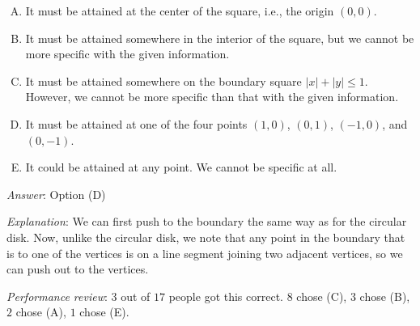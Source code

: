 \documentclass[10pt]{amsart}
\begin{document}
\begin{enumerate}
  \begin{enumerate}[(A)]
  \item It must be attained at the center of the square, i.e., the
    origin $(0,0)$.
  \item It must be attained somewhere in the interior of the square, but
    we cannot be more specific with the given information.
  \item It must be attained somewhere on the boundary square $|x| +
    |y| \le 1$. However, we cannot be more specific than that with the
    given information.
  \item It must be attained at one of the four points $(1,0)$,
    $(0,1)$, $(-1,0)$, and $(0,-1)$. 
  \item It could be attained at any point. We cannot be specific at all.
  \end{enumerate}

  {\em Answer}: Option (D)

  {\em Explanation}: We can first push to the boundary the same way as
  for the circular disk. Now, unlike the circular disk, we note that
  any point in the boundary that is to one of the vertices is on a
  line segment joining two adjacent vertices, so we can push out to
  the vertices.

  {\em Performance review}: $3$ out of $17$ people got this
  correct. $8$ chose (C), $3$ chose (B), $2$ chose (A), $1$ chose (E).
\end{enumerate}
\end{document}
